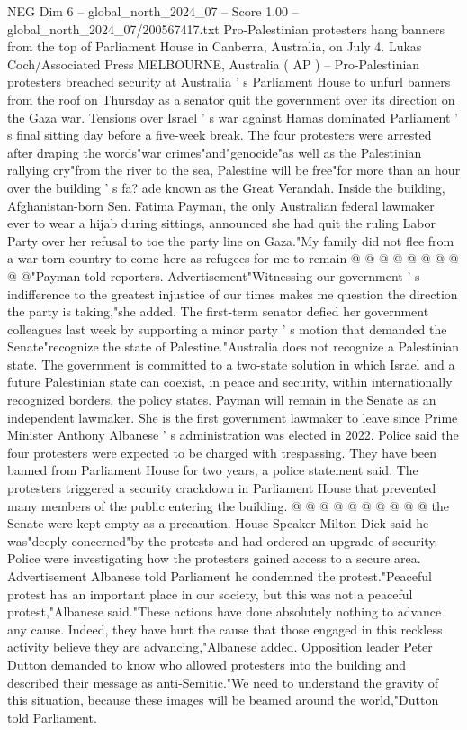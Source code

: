 \begin{textsample}{NEG Dim 6 – global\_north\_2024\_07 – Score 1.00 – global\_north\_2024\_07/200567417.txt}  \label{ex:f6_neg_144}
Pro-Palestinian protesters hang banners from the top of Parliament House in Canberra, Australia, on July 4.
Lukas Coch/Associated Press MELBOURNE, Australia ( AP ) -- Pro-Palestinian protesters breached security at Australia ' s Parliament House to unfurl banners from the roof on Thursday as a senator quit the government over its direction on the Gaza war.
Tensions over Israel ' s war against Hamas dominated Parliament ' s final sitting day before a five-week break.
The four protesters were arrested after draping the words"war crimes"and"genocide"as well as the Palestinian rallying cry"from the river to the sea, Palestine will be free"for more than an hour over the building ' s fa? ade known as the Great Verandah.
Inside the building, Afghanistan-born Sen.
Fatima Payman, the only Australian federal lawmaker ever to wear a hijab during sittings, announced she had quit the ruling Labor Party over her refusal to toe the party line on Gaza."My family did not flee from a war-torn country to come here as refugees for me to remain @ @ @ @ @ @ @ @ @ @"Payman told reporters.
Advertisement"Witnessing our government ' s indifference to the greatest injustice of our times makes me question the direction the party is taking,"she added.
The first-term senator defied her government colleagues last week by supporting a minor party ' s motion that demanded the Senate"recognize the state of Palestine."Australia does not recognize a Palestinian state.
The government is committed to a two-state solution in which Israel and a future Palestinian state can coexist, in peace and security, within internationally recognized borders, the policy states.
Payman will remain in the Senate as an independent lawmaker.
She is the first government lawmaker to leave since Prime Minister Anthony Albanese ' s administration was elected in 2022.
Police said the four protesters were expected to be charged with trespassing.
They have been banned from Parliament House for two years, a police statement said.
The protesters triggered a security crackdown in Parliament House that prevented many members of the public entering the building. @ @ @ @ @ @ @ @ @ @ the Senate were kept empty as a precaution.
House Speaker Milton Dick said he was"deeply concerned"by the protests and had ordered an upgrade of security.
Police were investigating how the protesters gained access to a secure area.
Advertisement Albanese told Parliament he condemned the protest."Peaceful protest has an important place in our society, but this was not a peaceful protest,"Albanese said."These actions have done absolutely nothing to advance any cause.
Indeed, they have hurt the cause that those engaged in this reckless activity believe they are advancing,"Albanese added.
Opposition leader Peter Dutton demanded to know who allowed protesters into the building and described their message as anti-Semitic."We need to understand the gravity of this situation, because these images will be beamed around the world,"Dutton told Parliament.

\end{textsample}

